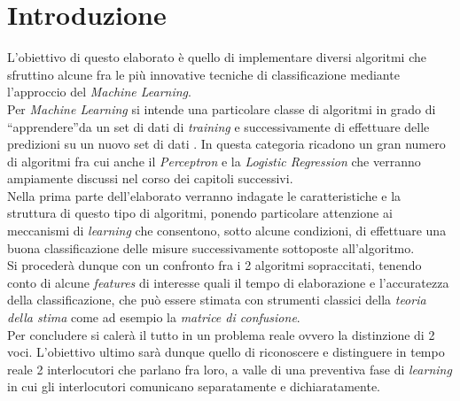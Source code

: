 \chapter*{Introduzione}

L'obiettivo di questo elaborato \`{e} quello di implementare diversi algoritmi che sfruttino alcune fra le pi\`{u} innovative tecniche di classificazione mediante l'approccio del \emph{Machine Learning}. \\

Per \emph{Machine Learning} si intende una particolare classe di algoritmi in grado di \textquotedblleft apprendere\textquotedblright da un set di dati di \emph{training} e successivamente di effettuare delle predizioni su un nuovo set di dati \cite{Machine Learning}. In questa categoria ricadono un gran numero di algoritmi fra cui anche il \emph{Perceptron} e la \emph{Logistic Regression} che verranno ampiamente discussi nel corso dei capitoli successivi.\\

Nella prima parte dell'elaborato verranno indagate le caratteristiche e la struttura di questo tipo di algoritmi, ponendo particolare attenzione ai meccanismi di \emph{learning} che consentono, sotto alcune condizioni, di effettuare una buona classificazione delle misure successivamente sottoposte all'algoritmo.\\

Si proceder\`{a} dunque con un confronto fra i 2 algoritmi sopraccitati, tenendo conto di alcune \emph{features} di interesse quali il tempo di elaborazione e l'accuratezza della classificazione, che pu\`{o} essere stimata con strumenti classici della \emph{teoria della stima} come ad esempio la \emph{matrice di confusione}.\\

Per concludere si caler\`{a} il tutto in un problema reale ovvero la distinzione di 2 voci. L'obiettivo ultimo sar\`{a} dunque quello di riconoscere e distinguere in tempo reale 2 interlocutori che parlano fra loro, a valle di una preventiva fase di \emph{learning} in cui gli interlocutori comunicano separatamente e dichiaratamente.